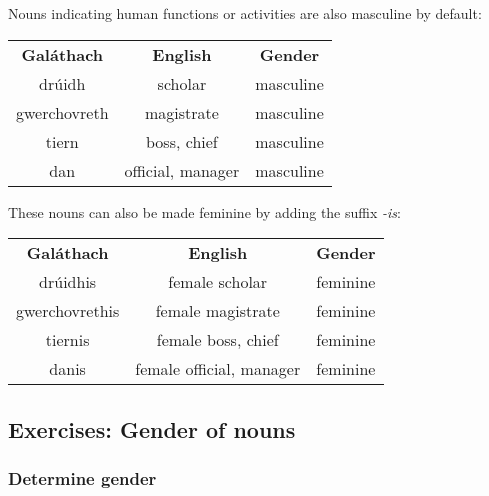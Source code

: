 Nouns indicating human functions or activities are also masculine by default:
\begin{table}[H]
\centering
\begin{tabular}{ccc}
  \toprule
  \textbf{Gal\'{a}thach} & \textbf{English} & \textbf{Gender}\\
  \cmidrule(lr){1-1}\cmidrule(lr){2-2}\cmidrule(lr){3-3}
  dr\'{u}idh & scholar & masculine\\
  gwerchovreth & magistrate & masculine\\
  tiern & boss, chief & masculine\\
  dan & official, manager & masculine\\
  \bottomrule
\end{tabular}
\label{example_gender_human_functions}
\end{table}

These nouns can also be made feminine by adding the suffix \textit{-is}:
\begin{table}[H]
\centering
\begin{tabular}{ccc}
  \toprule
  \textbf{Gal\'{a}thach} & \textbf{English} & \textbf{Gender}\\
  \cmidrule(lr){1-1}\cmidrule(lr){2-2}\cmidrule(lr){3-3}
  dr\'{u}idhis & female scholar & feminine\\
  gwerchovrethis & female magistrate & feminine\\
  tiernis & female boss, chief & feminine\\
  danis & female official, manager & feminine\\
  \bottomrule
\end{tabular}
\label{example_gender_human_functions_femalize}
\end{table}

\newpage
\subsection{Exercises: Gender of nouns}

\subsubsection{Determine gender}

